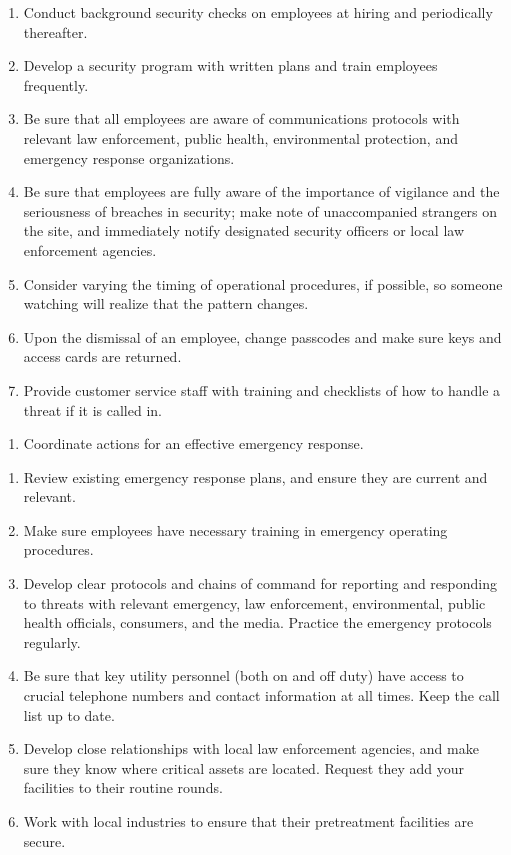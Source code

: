 \documentclass{article}
\begin{document}
\begin{enumerate}
\item
  Conduct background security checks on employees at hiring and
  periodically thereafter.
\item
  Develop a security program with written plans and train employees
  frequently.
\item
  Be sure that all employees are aware of communications protocols with
  relevant law enforcement, public health, environmental protection, and
  emergency response organizations.
\item
  Be sure that employees are fully aware of the importance of vigilance
  and the seriousness of breaches in security; make note of
  unaccompanied strangers on the site, and immediately notify designated
  security officers or local law enforcement agencies.
\item
  Consider varying the timing of operational procedures, if possible, so
  someone watching will realize that the pattern changes.
\item
  Upon the dismissal of an employee, change passcodes and make sure keys
  and access cards are returned.
\item
  Provide customer service staff with training and checklists of how to
  handle a threat if it is called in.
\end{enumerate}

\begin{enumerate}
\item
  Coordinate actions for an effective emergency response.
\end{enumerate}

\begin{enumerate}
\item
  Review existing emergency response plans, and ensure they are current
  and relevant.
\item
  Make sure employees have necessary training in emergency operating
  procedures.
\item
  Develop clear protocols and chains of command for reporting and
  responding to threats with relevant emergency, law enforcement,
  environmental, public health officials, consumers, and the media.
  Practice the emergency protocols regularly.
\item
  Be sure that key utility personnel (both on and off duty) have access
  to crucial telephone numbers and contact information at all times.
  Keep the call list up to date.
\item
  Develop close relationships with local law enforcement agencies, and
  make sure they know where critical assets are located. Request they
  add your facilities to their routine rounds.
\item
  Work with local industries to ensure that their pretreatment
  facilities are secure.
\end{enumerate}
\end{document}
